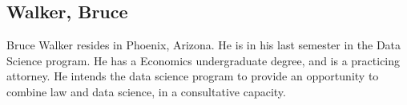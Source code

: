 \subsection{Walker, Bruce}

Bruce Walker resides in Phoenix, Arizona.  He is in his last semester in the
Data Science program.  He has a Economics undergraduate degree, and is a
practicing attorney.  He intends the data science program to provide an
opportunity to combine law and data science, in a consultative capacity.
